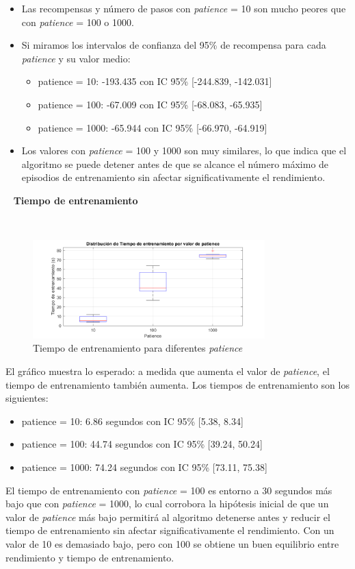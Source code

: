 \begin{itemize}
    \item Las recompensas y número de pasos con \textit{patience} = 10 son mucho peores que con \textit{patience} = 100 o 1000.
    \item Si miramos los intervalos de confianza del 95\% de recompensa para cada \textit{patience} y su valor medio:
    \begin{itemize}
        \item patience = 10: -193.435 con IC 95\% [-244.839, -142.031]
        \item patience = 100: -67.009 con IC 95\% [-68.083, -65.935]
        \item patience = 1000: -65.944 con IC 95\% [-66.970, -64.919]
    \end{itemize}
    \item Los valores con \textit{patience} = 100 y 1000 son muy similares, lo que indica que el algoritmo se puede detener antes de que se alcance el número máximo de episodios de entrenamiento sin afectar significativamente el rendimiento.
\end{itemize}

\
\newpage
\textbf{Tiempo de entrenamiento}

\ 

\begin{figure}[H]
    \centering
    \includegraphics[width=0.8\textwidth]{../../experiments/directEstimation/experiment-3/results/time.png}
    \caption{Tiempo de entrenamiento para diferentes \textit{patience}}
    \label{fig:directEstimation3-time}
\end{figure}

El gráfico muestra lo esperado: a medida que aumenta el valor de \textit{patience}, el tiempo de entrenamiento también aumenta. Los tiempos de entrenamiento son los siguientes:
\begin{itemize}
    \item patience = 10: 6.86 segundos con IC 95\% [5.38, 8.34]
    \item patience = 100: 44.74 segundos con IC 95\% [39.24, 50.24]
    \item patience = 1000: 74.24 segundos con IC 95\% [73.11, 75.38]
\end{itemize}

El tiempo de entrenamiento con \textit{patience} = 100 es entorno a 30 segundos más bajo que con \textit{patience} = 1000, lo cual corrobora la hipótesis inicial de que un valor de \textit{patience} más bajo permitirá al algoritmo detenerse antes y reducir el tiempo de entrenamiento sin afectar significativamente el rendimiento. Con un valor de 10 es demasiado bajo, pero con 100 se obtiene un buen equilibrio entre rendimiento y tiempo de entrenamiento.
